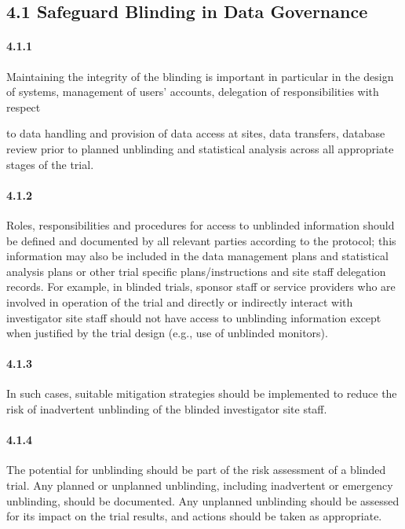 \documentclass[11pt]{article}
\begin{document}
\subsection{4.1 Safeguard Blinding in Data Governance}

\paragraph{4.1.1} Maintaining the integrity of the blinding is important in particular in the design of systems, management of users' accounts, delegation of responsibilities with respect

to data handling and provision of data access at sites, data transfers, database review prior to planned unblinding and statistical analysis across all appropriate stages of the trial.


\paragraph{4.1.2} Roles, responsibilities and procedures for access to unblinded information should be defined and documented by all relevant parties according to the protocol; this information may also be included in the data management plans and statistical analysis plans or other trial specific plans/instructions and site staff delegation records. For example, in blinded trials, sponsor staff or service providers who are involved in operation of the trial and directly or indirectly interact with investigator site staff should not have access to unblinding information except when justified by the trial design (e.g., use of unblinded monitors).

\paragraph{4.1.3} In such cases, suitable mitigation strategies should be implemented to reduce the risk of inadvertent unblinding of the blinded investigator site staff.

\paragraph{4.1.4} The potential for unblinding should be part of the risk assessment of a blinded trial. Any planned or unplanned unblinding, including inadvertent or emergency unblinding, should be documented. Any unplanned unblinding should be assessed for its impact on the trial results, and actions should be taken as appropriate.
\end{document}
